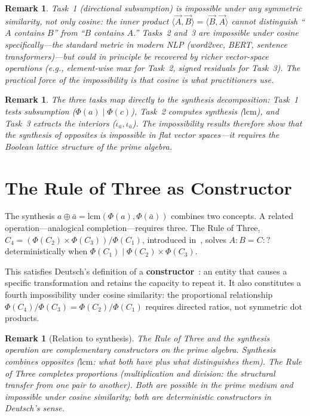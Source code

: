\documentclass[11pt,a4paper]{article}
\newtheorem{remark}[theorem]{Remark}
\begin{document}
\begin{remark}
Task~1 (directional subsumption) is impossible under \emph{any}
symmetric similarity, not only cosine: the inner product
$\langle\vec{A},\vec{B}\rangle=\langle\vec{B},\vec{A}\rangle$
cannot distinguish ``$A$ contains $B$'' from ``$B$ contains $A$.''
Tasks~2 and~3 are impossible under cosine specifically---the
standard metric in modern NLP (word2vec, BERT, sentence
transformers)---but could in principle be recovered by richer
vector-space operations (e.g., element-wise max for Task~2,
signed residuals for Task~3). The practical force of the
impossibility is that cosine is what practitioners use.
\end{remark}

\begin{remark}
The three tasks map directly to the synthesis decomposition:
Task~1 tests subsumption ($\Phi(a)\mid\Phi(c)$), Task~2 computes
synthesis ($\mathrm{lcm}$), and Task~3 extracts the interiors
($\iota_a,\iota_{\bar{a}}$). The impossibility results therefore
show that the \emph{synthesis of opposites} is impossible in flat
vector spaces---it requires the Boolean lattice structure of the
prime algebra.
\end{remark}

\section{The Rule of Three as Constructor}
\label{sec:rule3}

The synthesis $a\oplus\bar{a}=\mathrm{lcm}(\Phi(a),\Phi(\bar{a}))$
combines two concepts. A related operation---analogical
completion---requires three. The Rule of Three,
$C_4=(\Phi(C_2)\times\Phi(C_3))/\Phi(C_1)$, introduced
in~\citet{p1}, solves $A:B=C:?$ deterministically when
$\Phi(C_1)\mid\Phi(C_2)\times\Phi(C_3)$.

This satisfies Deutsch's definition of a
\textbf{constructor}~\citep{deutsch2013}: an entity that causes a
specific transformation and retains the capacity to repeat it. It
also constitutes a fourth impossibility under cosine similarity:
the proportional relationship $\Phi(C_4)/\Phi(C_3)=\Phi(C_2)/\Phi(C_1)$
requires directed ratios, not symmetric dot products.

\begin{remark}[Relation to synthesis]
The Rule of Three and the synthesis operation are complementary
constructors on the prime algebra. Synthesis combines
\emph{opposites} ($\mathrm{lcm}$: what both have plus what
distinguishes them). The Rule of Three completes
\emph{proportions} (multiplication and division: the structural
transfer from one pair to another). Both are possible in the
prime medium and impossible under cosine similarity; both are
deterministic constructors in Deutsch's sense.
\end{remark}
\end{document}
